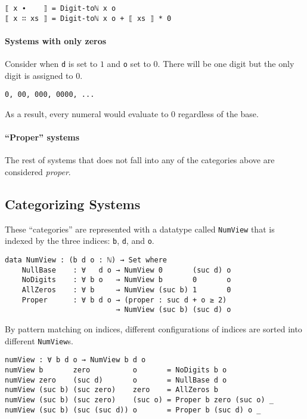 \documentclass[\main/thesis.tex]{subfiles}
\begin{document}
\begin{lstlisting}
⟦ x ∙    ⟧ = Digit-toℕ x o
⟦ x ∷ xs ⟧ = Digit-toℕ x o + ⟦ xs ⟧ * 0
\end{lstlisting}

\paragraph{Systems with only zeros}

Consider when {\lstinline|d|} is set to $ 1 $ and {\lstinline|o|} set to $ 0 $.
There will be one digit but the only digit is assigned to $ 0 $.

\begin{lstlisting}
0, 00, 000, 0000, ...
\end{lstlisting}

As a result, every numeral would evaluate to $ 0 $ regardless of the base.

\paragraph{``Proper'' systems}

The rest of systems that does not fall into any of the categories above
are considered \textit{proper}.

\subsection{Categorizing Systems}

These ``categories'' are represented with a datatype called {\lstinline|NumView|}
that is indexed by the three indices: {\lstinline|b|}, {\lstinline|d|}, and {\lstinline|o|}.

\begin{lstlisting}
data NumView : (b d o : ℕ) → Set where
    NullBase    : ∀   d o → NumView 0       (suc d) o
    NoDigits    : ∀ b o   → NumView b       0       o
    AllZeros    : ∀ b     → NumView (suc b) 1       0
    Proper      : ∀ b d o → (proper : suc d + o ≥ 2)
                          → NumView (suc b) (suc d) o
\end{lstlisting}

By pattern matching on indices, different configurations of indices are sorted into
different {\lstinline|NumView|}s.

\begin{lstlisting}
numView : ∀ b d o → NumView b d o
numView b       zero          o       = NoDigits b o
numView zero    (suc d)       o       = NullBase d o
numView (suc b) (suc zero)    zero    = AllZeros b
numView (suc b) (suc zero)    (suc o) = Proper b zero (suc o) _
numView (suc b) (suc (suc d)) o       = Proper b (suc d) o _
\end{lstlisting}
\end{document}

